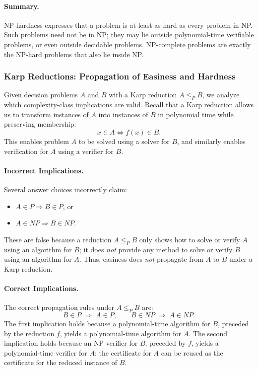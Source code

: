\documentclass[9pt]{extarticle}
\begin{document}
\paragraph{Summary.}
NP-hardness expresses that a problem is at least as hard as every problem in NP.
Such problems need not be in NP; they may lie outside polynomial-time verifiable
problems, or even outside decidable problems. NP-complete problems are exactly
the NP-hard problems that also lie inside NP.
\subsubsection{Karp Reductions: Propagation of Easiness and Hardness}

Given decision problems \(A\) and \(B\) with a Karp reduction \(A \le_P B\), we analyze which
complexity-class implications are valid. Recall that a Karp reduction allows us to transform
instances of \(A\) into instances of \(B\) in polynomial time while preserving membership:
\[
x \in A \iff f(x) \in B.
\]
This enables problem \(A\) to be solved using a solver for \(B\), and similarly enables
verification for \(A\) using a verifier for \(B\).

\paragraph{Incorrect Implications.}
Several answer choices incorrectly claim:
\begin{itemize}
    \item \(A \in P \Rightarrow B \in P\), or
    \item \(A \in NP \Rightarrow B \in NP\).
\end{itemize}
These are false because a reduction \(A \le_P B\) only shows how to solve or verify
\(A\) using an algorithm for \(B\); it does \emph{not} provide any method to solve or
verify \(B\) using an algorithm for \(A\). Thus, easiness does \emph{not} propagate from
\(A\) to \(B\) under a Karp reduction.

\paragraph{Correct Implications.}
The correct propagation rules under \(A \le_P B\) are:
\[
B \in P \;\Rightarrow\; A \in P,
\qquad
B \in NP \;\Rightarrow\; A \in NP.
\]
The first implication holds because a polynomial-time algorithm for \(B\), preceded by
the reduction \(f\), yields a polynomial-time algorithm for \(A\).
The second implication holds because an NP verifier for \(B\), preceded by \(f\),
yields a polynomial-time verifier for \(A\): the certificate for \(A\) can be reused
as the certificate for the reduced instance of \(B\).
\end{document}
